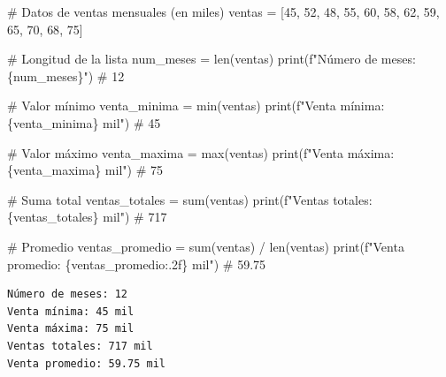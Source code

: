 \documentclass[
  doc,
  floatsintext,
  longtable,
  a4paper,
  nolmodern,
  notxfonts,
  notimes,
  12pt,
  colorlinks=true,linkcolor=blue,citecolor=blue,urlcolor=blue]{apa7}
\newenvironment{Shaded}{\begin{snugshade}}{\end{snugshade}}
\newcommand{\BuiltInTok}[1]{\textcolor[rgb]{0.00,0.23,0.31}{#1}}
\newcommand{\CommentTok}[1]{\textcolor[rgb]{0.37,0.37,0.37}{#1}}
\newcommand{\DecValTok}[1]{\textcolor[rgb]{0.68,0.00,0.00}{#1}}
\newcommand{\NormalTok}[1]{\textcolor[rgb]{0.00,0.23,0.31}{#1}}
\newcommand{\OperatorTok}[1]{\textcolor[rgb]{0.37,0.37,0.37}{#1}}
\newcommand{\SpecialCharTok}[1]{\textcolor[rgb]{0.37,0.37,0.37}{#1}}
\newcommand{\SpecialStringTok}[1]{\textcolor[rgb]{0.13,0.47,0.30}{#1}}
\begin{document}
\begin{Shaded}
\begin{Highlighting}[]
\CommentTok{\# Datos de ventas mensuales (en miles)}
\NormalTok{ventas }\OperatorTok{=}\NormalTok{ [}\DecValTok{45}\NormalTok{, }\DecValTok{52}\NormalTok{, }\DecValTok{48}\NormalTok{, }\DecValTok{55}\NormalTok{, }\DecValTok{60}\NormalTok{, }\DecValTok{58}\NormalTok{, }\DecValTok{62}\NormalTok{, }\DecValTok{59}\NormalTok{, }\DecValTok{65}\NormalTok{, }\DecValTok{70}\NormalTok{, }\DecValTok{68}\NormalTok{, }\DecValTok{75}\NormalTok{]}

\CommentTok{\# Longitud de la lista}
\NormalTok{num\_meses }\OperatorTok{=} \BuiltInTok{len}\NormalTok{(ventas)}
\BuiltInTok{print}\NormalTok{(}\SpecialStringTok{f"Número de meses: }\SpecialCharTok{\{}\NormalTok{num\_meses}\SpecialCharTok{\}}\SpecialStringTok{"}\NormalTok{)  }\CommentTok{\# 12}

\CommentTok{\# Valor mínimo}
\NormalTok{venta\_minima }\OperatorTok{=} \BuiltInTok{min}\NormalTok{(ventas)}
\BuiltInTok{print}\NormalTok{(}\SpecialStringTok{f"Venta mínima: }\SpecialCharTok{\{}\NormalTok{venta\_minima}\SpecialCharTok{\}}\SpecialStringTok{ mil"}\NormalTok{)  }\CommentTok{\# 45}

\CommentTok{\# Valor máximo}
\NormalTok{venta\_maxima }\OperatorTok{=} \BuiltInTok{max}\NormalTok{(ventas)}
\BuiltInTok{print}\NormalTok{(}\SpecialStringTok{f"Venta máxima: }\SpecialCharTok{\{}\NormalTok{venta\_maxima}\SpecialCharTok{\}}\SpecialStringTok{ mil"}\NormalTok{)  }\CommentTok{\# 75}

\CommentTok{\# Suma total}
\NormalTok{ventas\_totales }\OperatorTok{=} \BuiltInTok{sum}\NormalTok{(ventas)}
\BuiltInTok{print}\NormalTok{(}\SpecialStringTok{f"Ventas totales: }\SpecialCharTok{\{}\NormalTok{ventas\_totales}\SpecialCharTok{\}}\SpecialStringTok{ mil"}\NormalTok{)  }\CommentTok{\# 717}

\CommentTok{\# Promedio}
\NormalTok{ventas\_promedio }\OperatorTok{=} \BuiltInTok{sum}\NormalTok{(ventas) }\OperatorTok{/} \BuiltInTok{len}\NormalTok{(ventas)}
\BuiltInTok{print}\NormalTok{(}\SpecialStringTok{f"Venta promedio: }\SpecialCharTok{\{}\NormalTok{ventas\_promedio}\SpecialCharTok{:.2f\}}\SpecialStringTok{ mil"}\NormalTok{)  }\CommentTok{\# 59.75}
\end{Highlighting}
\end{Shaded}

\begin{verbatim}
Número de meses: 12
Venta mínima: 45 mil
Venta máxima: 75 mil
Ventas totales: 717 mil
Venta promedio: 59.75 mil
\end{verbatim}
\end{document}

